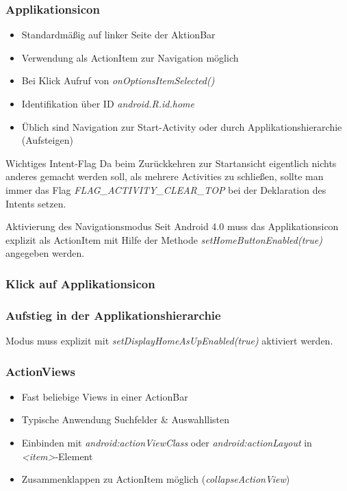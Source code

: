 \begin{frame}
   \frametitle{Applikationsicon}
   \begin{itemize}
      \item Standardmäßig auf linker Seite der AktionBar
      \item Verwendung als ActionItem zur Navigation möglich
      \item Bei Klick Aufruf von \emph{onOptionsItemSelected()}
      \item Identifikation über ID \emph{android.R.id.home}
      \item Üblich sind Navigation zur Start-Activity oder durch 
         Applikationshierarchie (Aufsteigen)
   \end{itemize}

   \begin{alertblock}{Wichtiges Intent-Flag}
      Da beim Zurückkehren zur Startansicht eigentlich nichts anderes gemacht werden soll, 
      als mehrere Activities zu schließen, sollte man immer das Flag 
      \emph{FLAG\_ACTIVITY\_CLEAR\_TOP} bei der Deklaration des Intents setzen.
   \end{alertblock}

   \begin{alertblock}{Aktivierung des Navigationsmodus}
      Seit Android 4.0 muss das Applikationsicon explizit als ActionItem 
      mit Hilfe der Methode \emph{setHomeButtonEnabled(true)} angegeben werden.
   \end{alertblock}
\end{frame}

\begin{frame}
   \frametitle{Klick auf Applikationsicon}
   
\end{frame}

\begin{frame}
   \frametitle{Aufstieg in der Applikationshierarchie}
   Modus muss explizit mit \emph{setDisplayHomeAsUpEnabled(true)} aktiviert werden.

   
\end{frame}

\begin{frame}
   \frametitle{ActionViews}
   \begin{itemize}
      \item Fast beliebige Views in einer ActionBar
      \item Typische Anwendung Suchfelder \& Auswahllisten
      \item Einbinden mit \emph{android:actionViewClass} 
         oder \emph{android:actionLayout} in \emph{\textless{}item\textgreater}-Element
      \item Zusammenklappen zu ActionItem möglich (\emph{collapseActionView})
   \end{itemize}

   
\end{frame}


